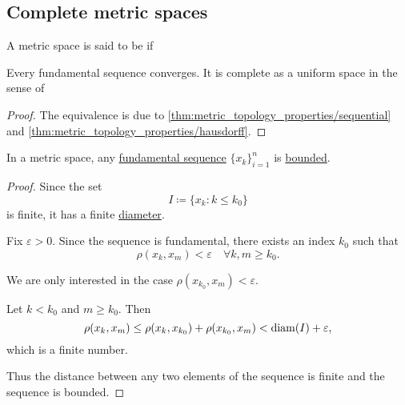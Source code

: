 \subsection{Complete metric spaces}\label{subsec:metric_convergence}

\begin{definition}\label{def:complete_metric_space}
  A metric space is said to be  if
  \begin{defenum}
     Every fundamental sequence converges.
     It is complete as a uniform space in the sense of 
  \end{defenum}
\end{definition}
\begin{proof}
  The equivalence is due to \cref{thm:metric_topology_properties/sequential} and \cref{thm:metric_topology_properties/hausdorff}.
\end{proof}

\begin{proposition}\label{thm:fundamental_sequence_is_bounded}
  In a metric space, any \hyperref[def:fundamental_net]{fundamental sequence} \( \{ x_k \}_{i=1}^n \) is \hyperref[def:metric_space/bounded_sequence]{bounded}.
\end{proposition}
\begin{proof}
  Since the set
  \begin{equation*}
    I \coloneqq \{ x_k \colon k \leq k_0 \}
  \end{equation*}
  is finite, it has a finite \hyperref[def:metric_space/diameter]{diameter}.

  Fix \( \varepsilon > 0 \). Since the sequence is fundamental, there exists an index \( k_0 \) such that
  \begin{equation*}
    \rho(x_k, x_m) < \varepsilon \quad\forall k, m \geq k_0.
  \end{equation*}

  We are only interested in the case \( \rho(x_{k_0}, x_m) < \varepsilon \).

  Let \( k < k_0 \) and \( m \geq k_0 \). Then
  \begin{equation*}
    \rho(x_k, x_m) \leq \rho(x_k, x_{k_0}) + \rho(x_{k_0}, x_m) < \operatorname{diam}(I) + \varepsilon,
  \end{equation*}
  which is a finite number.

  Thus the distance between any two elements of the sequence is finite and the sequence is bounded.
\end{proof}

